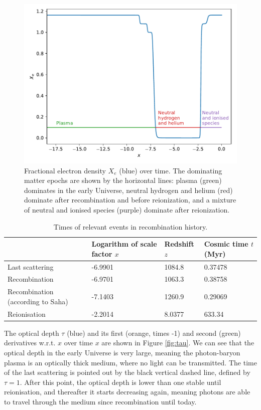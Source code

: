 \documentclass{aa}
\begin{document}
\begin{figure}[ht]
    \centering
    \includegraphics[width=\hsize]{report/figures/Xe-reion.pdf}
    \caption{Fractional electron density $X_e$ (blue) over time. The dominating matter epochs are shown by the horizontal lines: plasma (green) dominates in the early Universe, neutral hydrogen and helium (red) dominate after recombination and before reionization, and a mixture of neutral and ionised species (purple) dominate after reionization.}
    \label{fig:Xe-reion}
\end{figure}

\begin{table}[ht]
\caption{Times of relevant events in recombination history.}             
\label{table:times-rec}      
\centering          
\begin{tabular}{l l l l}     %
\hline\hline       
& Logarithm of scale factor $x$      & Redshift $z$     & Cosmic time $t$ (Myr)\\ 
\hline                    
Last scattering   & -6.9901  & 1084.8  & 0.37478 \\
Recombination & -6.9701 & 1063.3 & 0.38758                 \\
Recombination (according to Saha) & -7.1403 & 1260.9 & 0.29069\\
Reionisation & -2.2014 & 8.0377 & 633.34\\
\hline                  
\end{tabular}
\end{table}

The optical depth $\tau$ (blue) and its first (orange, times -1) and second (green) derivatives w.r.t. $x$ over time $x$ are shown in Figure \ref{fig:tau}. We can see that the optical depth in the early Universe is very large, meaning the photon-baryon plasma is an optically thick medium, where no light can be transmitted. The time of the last scattering is pointed out by the black vertical dashed line, defined by $\tau=1$. After this point, the optical depth is lower than one stable until reionisation, and thereafter it starts decreasing again, meaning photons are able to travel through the medium since recombination until today.
\end{document}

